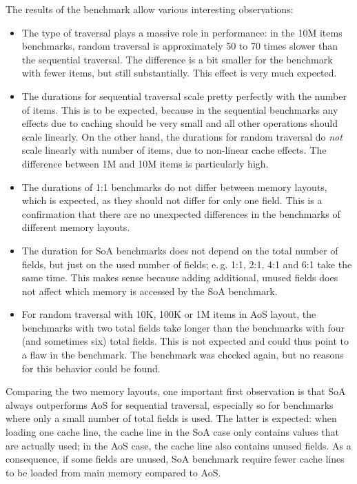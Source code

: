 The results of the benchmark allow various interesting observations:

\begin{itemize}
  \item The type of traversal plays a massive role in performance: in the 10M items benchmarks, random traversal is approximately 50 to 70 times slower than the sequential traversal.
  The difference is a bit smaller for the benchmark with fewer items, but still substantially.
  This effect is very much expected.
  \item The durations for sequential traversal scale pretty perfectly with the number of items.
  This is to be expected, because in the sequential benchmarks any effects due to caching should be very small and all other operations should scale linearly.
  On the other hand, the durations for random traversal do \emph{not} scale linearly with number of items, due to non-linear cache effects.
  The difference between 1M and 10M items is particularly high.
  \item The durations of \textsf{1:1} benchmarks do not differ between memory layouts, which is expected, as they should not differ for only one field.
  This is a confirmation that there are no unexpected differences in the benchmarks of different memory layouts.
  \item The duration for SoA benchmarks does not depend on the total number of fields, but just on the used number of fields; e.\,g. \textsf{1:1}, \textsf{2:1}, \textsf{4:1} and \textsf{6:1} take the same time.
  This makes sense because adding additional, unused fields does not affect which memory is accessed by the SoA benchmark.
  \item For random traversal with 10K, 100K or 1M items in AoS layout, the benchmarks with two total fields take longer than the benchmarks with four (and sometimes six) total fields.
  This is not expected and could thus point to a flaw in the benchmark.
  The benchmark was checked again, but no reasons for this behavior could be found.
\end{itemize}

Comparing the two memory layouts, one important first observation is that SoA always outperforms AoS for sequential traversal, especially so for benchmarks where only a small number of total fields is used.
The latter is expected: when loading one cache line, the cache line in the SoA case only contains values that are actually used; in the AoS case, the cache line also contains unused fields.
As a consequence, if some fields are unused, SoA benchmark require fewer cache lines to be loaded from main memory compared to AoS.


